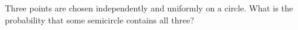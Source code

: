 Three points are chosen independently and uniformly on a circle. What is the probability that some semicircle contains all three?
